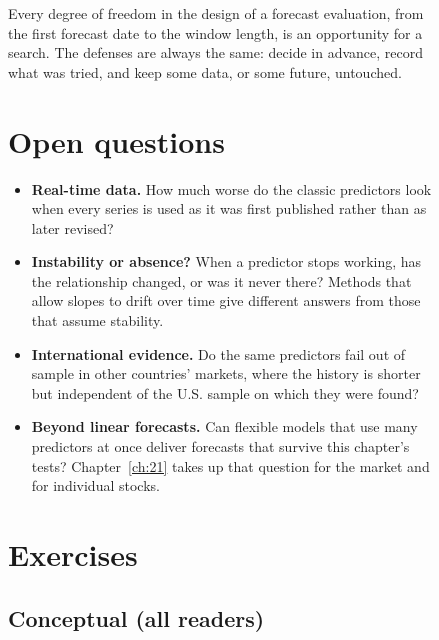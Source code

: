 \begin{figure}[htbp]
Every degree of freedom in the design of a forecast evaluation, from the first forecast date to the window length, is an opportunity for a search. The defenses are always the same: decide in advance, record what was tried, and keep some data, or some future, untouched.

\section{Open questions}
\label{sec:05-open}

\begin{itemize}
  \item \textbf{Real-time data.} How much worse do the classic predictors look when every series is used as it was first published rather than as later revised?
  \item \textbf{Instability or absence?} When a predictor stops working, has the relationship changed, or was it never there? Methods that allow slopes to drift over time give different answers from those that assume stability.
  \item \textbf{International evidence.} Do the same predictors fail out of sample in other countries' markets, where the history is shorter but independent of the U.S. sample on which they were found?
  \item \textbf{Beyond linear forecasts.} Can flexible models that use many predictors at once deliver forecasts that survive this chapter's tests? Chapter~\ref{ch:21} takes up that question for the market and for individual stocks.
\end{itemize}

\section*{Exercises}

\subsection*{Conceptual (all readers)}


\end{figure}

